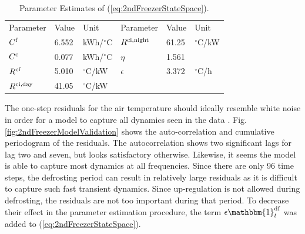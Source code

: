 \begin{table}[!t]
    \caption{Parameter Estimates of (\ref{eq:2ndFreezerStateSpace}).}
    \label{tab:parameter_estimates}
    \centering
    \begin{tabular}[b]{|l|l|l||l|l|l|}
        \hline
        Parameter                 & Value & Unit            & Parameter                   & Value & Unit           \\ \hhline{|=|=|=|=|=|=|}
        $C^{\rm{f}}$              & 6.552 & kWh/$^{\circ}$C & $R^{\rm{ci}, \text{night}}$ & 61.25 & $^{\circ}$C/kW \\
        $C^{\rm{c}}$              & 0.077 & kWh/$^{\circ}$C & $\eta$                      & 1.561 &                \\
        $R^{\rm{cf}}$             & 5.010 & $^{\circ}$C/kW  & $\epsilon$                  & 3.372 & $^{\circ}$C/h  \\
        $R^{\rm{ci}, \text{day}}$ & 41.05 & $^{\circ}$C/kW  &                             &       &                \\ \hline
    \end{tabular}
    \vspace{-2mm}
\end{table}





The one-step residuals for the air temperature should ideally resemble white noise in order for a model to capture all dynamics seen in the data \cite{madsen2007time}. Fig. \ref{fig:2ndFreezerModelValidation} shows the auto-correlation and cumulative periodogram of the residuals. The autocorrelation shows two significant lags for lag two and seven, but looks satisfactory otherwise. Likewise,  it seems the model is able to capture most dynamics at all frequencies.
%
Since there are only 96 time steps, the defrosting period can result in relatively large residuals as it is difficult to capture such fast transient dynamics. Since up-regulation is not allowed during defrosting, the residuals are not too important during that period. To decrease their effect in the parameter estimation procedure, the term $ \epsilon \mathbbm{1}^{\text{df}}_{t}$ was added to (\ref{eq:2ndFreezerStateSpace}).


